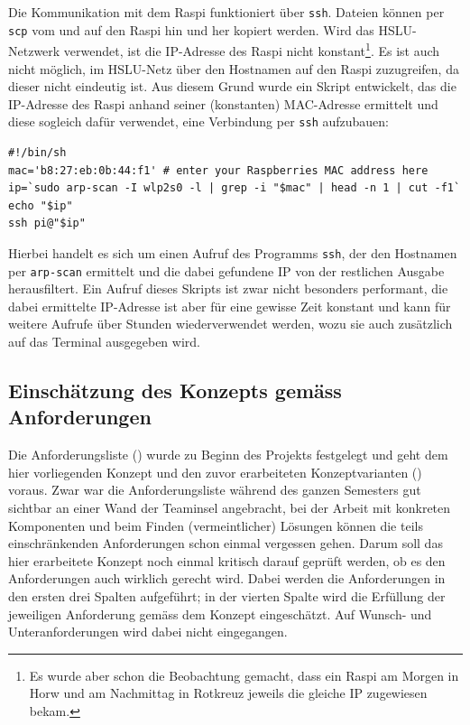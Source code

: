 Die Kommunikation mit dem Raspi funktioniert über \texttt{ssh}. Dateien können per \texttt{scp} vom und auf den Raspi hin und her kopiert werden. Wird das HSLU-Netzwerk verwendet, ist die IP-Adresse des Raspi nicht konstant\footnote{Es wurde aber schon die Beobachtung gemacht, dass ein Raspi am Morgen in Horw und am Nachmittag in Rotkreuz jeweils die gleiche IP zugewiesen bekam.}. Es ist auch nicht möglich, im HSLU-Netz über den Hostnamen auf den Raspi zuzugreifen, da dieser nicht eindeutig ist. Aus diesem Grund wurde ein Skript entwickelt, das die IP-Adresse des Raspi anhand seiner (konstanten) MAC-Adresse ermittelt und diese sogleich dafür verwendet, eine Verbindung per \texttt{ssh} aufzubauen:

\begin{lstlisting}
#!/bin/sh
mac='b8:27:eb:0b:44:f1' # enter your Raspberries MAC address here
ip=`sudo arp-scan -I wlp2s0 -l | grep -i "$mac" | head -n 1 | cut -f1`
echo "$ip"
ssh pi@"$ip"
\end{lstlisting}

Hierbei handelt es sich um einen Aufruf des Programms \texttt{ssh}, der den Hostnamen per \texttt{arp-scan} ermittelt und die dabei gefundene IP von der restlichen Ausgabe herausfiltert. Ein Aufruf dieses Skripts ist zwar nicht besonders performant, die dabei ermittelte IP-Adresse ist aber für eine gewisse Zeit konstant und kann für weitere Aufrufe über Stunden wiederverwendet werden, wozu sie auch zusätzlich auf das Terminal ausgegeben wird.

\subsection{Einschätzung des Konzepts gemäss Anforderungen}

Die Anforderungsliste () wurde zu Beginn des Projekts festgelegt und geht dem hier vorliegenden Konzept und den zuvor erarbeiteten Konzeptvarianten () voraus. Zwar war die Anforderungsliste während des ganzen Semesters gut sichtbar an einer Wand der Teaminsel angebracht, bei der Arbeit mit konkreten Komponenten und beim Finden (vermeintlicher) Lösungen können die teils einschränkenden Anforderungen schon einmal vergessen gehen. Darum soll das hier erarbeitete Konzept noch einmal kritisch darauf geprüft werden, ob es den Anforderungen auch wirklich gerecht wird. Dabei werden die Anforderungen in den ersten drei Spalten aufgeführt; in der vierten Spalte wird die Erfüllung der jeweiligen Anforderung gemäss dem Konzept eingeschätzt. Auf Wunsch- und Unteranforderungen wird dabei nicht eingegangen.

